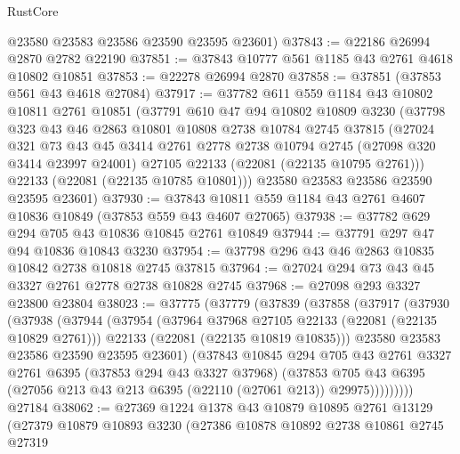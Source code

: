 \begin{lexlean}{RustCore}
\begin{coremodule}
      @23580
      @23583
      @23586
      @23590
      @23595
      @23601)
@37843 := @22186 @26994 @2870 @2782 @22190
@37851 := @37843 @10777 @561 @1185 @43 @2761 @4618 @10802 @10851
@37853 := @22278 @26994 @2870
@37858 := @37851 (@37853 @561 @43 @4618 @27084)
@37917 := @37782
    @611
    @559
    @1184
    @43
    @10802
    @10811
    @2761
    @10851
    (@37791
      @610
      @47
      @94
      @10802
      @10809
      @3230
      (@37798
        @323
        @43
        @46
        @2863
        @10801
        @10808
        @2738
        @10784
        @2745
        @37815
        (@27024
          @321
          @73
          @43
          @45
          @3414
          @2761
          @2778
          @2738
          @10794
          @2745
          (@27098 @320 @3414 @23997 @24001)
          @27105
          @22133
          (@22081 (@22135 @10795 @2761)))
        @22133
        (@22081 (@22135 @10785 @10801)))
      @23580
      @23583
      @23586
      @23590
      @23595
      @23601)
@37930 := @37843 @10811 @559 @1184 @43 @2761 @4607 @10836 @10849 (@37853 @559 @43 @4607 @27065)
@37938 := @37782 @629 @294 @705 @43 @10836 @10845 @2761 @10849
@37944 := @37791 @297 @47 @94 @10836 @10843 @3230
@37954 := @37798 @296 @43 @46 @2863 @10835 @10842 @2738 @10818 @2745 @37815
@37964 := @27024 @294 @73 @43 @45 @3327 @2761 @2778 @2738 @10828 @2745
@37968 := @27098 @293 @3327 @23800 @23804
@38023 := @37775
    (@37779
      (@37839
        (@37858
          (@37917
            (@37930
              (@37938
                (@37944
                  (@37954
                    (@37964 @37968 @27105 @22133 (@22081 (@22135 @10829 @2761)))
                    @22133
                    (@22081 (@22135 @10819 @10835)))
                  @23580
                  @23583
                  @23586
                  @23590
                  @23595
                  @23601)
                (@37843
                  @10845
                  @294
                  @705
                  @43
                  @2761
                  @3327
                  @2761
                  @6395
                  (@37853 @294 @43 @3327 @37968)
                  (@37853
                    @705
                    @43
                    @6395
                    (@27056 @213 @43 @213 @6395 (@22110 (@27061 @213)) @29975)))))))))
    @27184
@38062 := @27369
    @1224
    @1378
    @43
    @10879
    @10895
    @2761
    @13129
    (@27379
      @10879
      @10893
      @3230
      (@27386
        @10878
        @10892
        @2738
        @10861
        @2745
        @27319

\end{coremodule}
\end{lexlean}
